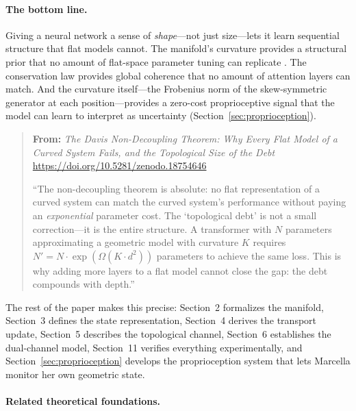 \documentclass[11pt,a4paper]{article}
\theoremstyle{definition}
\theoremstyle{remark}
\begin{document}
\paragraph{The bottom line.}
Giving a neural network a sense of \emph{shape}---not just size---lets it learn sequential structure that flat models cannot. The manifold's curvature provides a structural prior that no amount of flat-space parameter tuning can replicate \cite{davis2026nondecoupling}. The conservation law provides global coherence that no amount of attention layers can match. And the curvature itself---the Frobenius norm of the skew-symmetric generator at each position---provides a zero-cost proprioceptive signal that the model can learn to interpret as uncertainty (Section~\ref{sec:proprioception}).

\begin{quote}
\small
\textbf{From:} \emph{The Davis Non-Decoupling Theorem: Why Every Flat Model of a Curved System Fails, and the Topological Size of the Debt} \cite{davis2026nondecoupling}\\
\url{https://doi.org/10.5281/zenodo.18754646}

\medskip
``The non-decoupling theorem is absolute: no flat representation of a curved system can match the curved system's performance without paying an \emph{exponential} parameter cost. The `topological debt' is not a small correction---it is the entire structure. A transformer with $N$ parameters approximating a geometric model with curvature $K$ requires $N' = N \cdot \exp(\Omega(K \cdot d^2))$ parameters to achieve the same loss. This is why adding more layers to a flat model cannot close the gap: the debt compounds with depth.''
\end{quote}

The rest of the paper makes this precise: Section~2 formalizes the manifold, Section~3 defines the state representation, Section~4 derives the transport update, Section~5 describes the topological channel, Section~6 establishes the dual-channel model, Section~11 verifies everything experimentally, and Section~\ref{sec:proprioception} develops the proprioception system that lets Marcella monitor her own geometric state.

\paragraph{Related theoretical foundations.}
\end{document}
